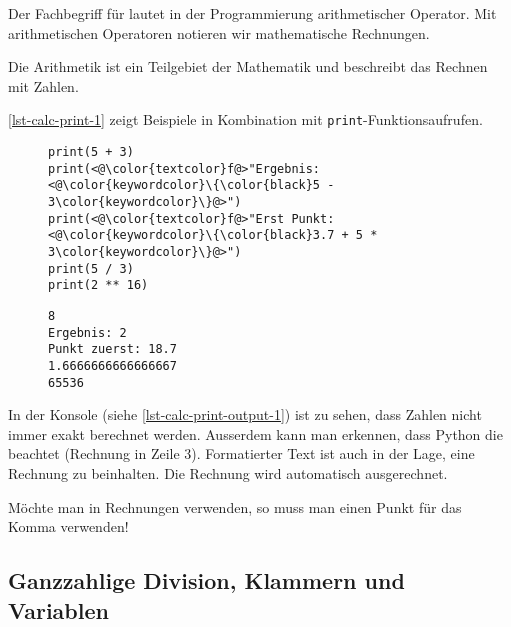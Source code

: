 \begin{definition}
Der Fachbegriff für  lautet in der Programmierung arithmetischer Operator. Mit arithmetischen Operatoren notieren wir mathematische Rechnungen.
\end{definition}

Die Arithmetik ist ein Teilgebiet der Mathematik und beschreibt das Rechnen mit Zahlen.

\begin{example}
\autoref{lst-calc-print-1} zeigt Beispiele in Kombination mit \lstinline{print}-Funktionsaufrufen.

\begin{figure}[htb]
\centering
\begin{minipage}{0.6\textwidth}
\centering
\begin{lstlisting}[label={lst-calc-print-1}, caption={\graybgtexttt{rechenbeispiel\_1.py}}]
print(5 + 3)
print(<@\color{textcolor}f@>"Ergebnis: <@\color{keywordcolor}\{\color{black}5 - 3\color{keywordcolor}\}@>")
print(<@\color{textcolor}f@>"Erst Punkt: <@\color{keywordcolor}\{\color{black}3.7 + 5 * 3\color{keywordcolor}\}@>")
print(5 / 3)
print(2 ** 16)
\end{lstlisting}
\end{minipage}
\hfill
\begin{minipage}{0.35\textwidth}
\centering
\begin{lstlisting}[language=output, caption={Konsolenausgabe}, label={lst-calc-print-output-1}]
8
Ergebnis: 2
Punkt zuerst: 18.7
1.6666666666666667
65536
\end{lstlisting}
\end{minipage}
\end{figure}

In der Konsole (siehe \autoref{lst-calc-print-output-1}) ist zu sehen, dass Zahlen nicht immer exakt berechnet werden. Ausserdem kann man erkennen, dass Python die  beachtet (Rechnung in Zeile \num{3}). Formatierter Text ist auch in der Lage, eine Rechnung zu beinhalten. Die Rechnung wird automatisch ausgerechnet.

\end{example}

\begin{important}
Möchte man  in Rechnungen verwenden, so muss man einen Punkt für das Komma verwenden!
\end{important}

\subsection{Ganzzahlige Division, Klammern und Variablen}

